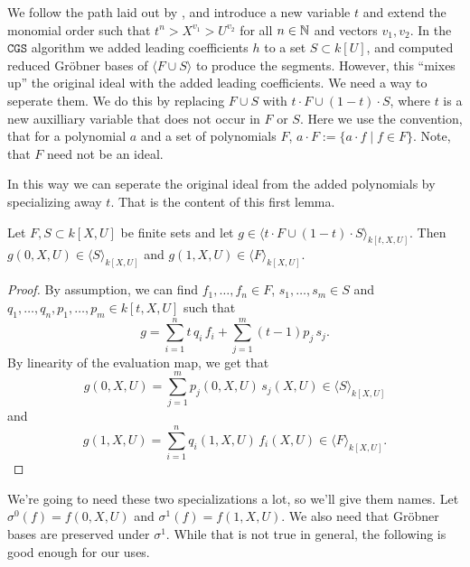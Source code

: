 We follow the path laid out by \cite{ss_algo}, and introduce a new variable $t$ and extend the monomial order such that $t^{n} > X^{v_{1}} > U^{v_{2}}$ for all $n \in \mathbb{N}$ and vectors $v_{1}, v_{2}$. In the $\mathtt{CGS}$ algorithm we added leading coefficients $h$ to a set $S \subset k[U]$, and computed reduced Gröbner bases of $\langle F \cup S \rangle$ to produce the segments. However, this ``mixes up'' the original ideal with the added leading coefficients. We need a way to seperate them. We do this by replacing $F \cup S$ with $t\cdot F \cup (1-t)\cdot S$, where $t$ is a new auxilliary variable that does not occur in $F$ or $S$. Here we use the convention, that for a polynomial $a$ and a set of polynomials $F$, $a\cdot F := \{a \cdot f \mid f \in F\}$. Note, that $F$ need not be an ideal.

In this way we can seperate the original ideal from the added polynomials by specializing away $t$. That is the content of this first lemma.

\begin{lemma}\label{lem:seperation}
  Let $F, S \subset k[X, U]$ be finite sets and let $g \in \langle t\cdot F \cup (1-t)\cdot S \rangle_{k[t, X, U]}$. Then $g(0, X, U) \in \langle S \rangle_{k[X, U]}$ and $g(1, X, U) \in \langle F \rangle_{k[X, U]}$.
\end{lemma}
\begin{proof}
  By assumption, we can find $f_{1}, \dots, f_{n} \in F$, $s_{1}, \dots, s_{m} \in S$ and $q_{1}, \dots, q_{n}, p_{1}, \dots, p_{m} \in k[t, X, U]$ such that
  \[g = \sum_{i=1}^{n} t\, q_{i}\, f_{i} + \sum_{j=1}^{m} (t-1) p_{j}\, s_{j}.\]
  By linearity of the evaluation map, we get that
  \[g(0, X, U) = \sum_{j=1}^{m} p_{j}(0, X, U)\, s_{j}(X, U) \in \langle S \rangle_{k[X, U]}\]
  and
  \[g(1, X, U) = \sum_{i=1}^{n} q_{i}(1, X, U)\, f_{i}(X, U) \in \langle F \rangle_{k[X, U]}.\]
\end{proof}

We're going to need these two specializations a lot, so we'll give them names. Let $\sigma^{0}(f) = f(0, X, U)$ and $\sigma^{1}(f) = f(1, X, U)$. We also need that Gröbner bases are preserved under $\sigma^{1}$. While that is not true in general, the following is good enough for our uses.

